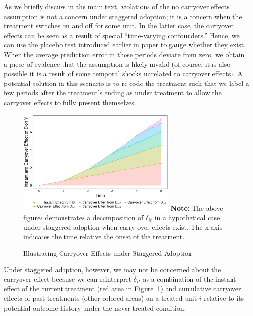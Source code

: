 \documentclass[12pt]{article}
\let\oldcenter\center
\let\oldendcenter\endcenter
\renewenvironment{center}{\setlength\topsep{0pt}\oldcenter}{\oldendcenter}
\begin{document}
As we briefly discuss in the main text, violations of the no carryover effects assumption is not a concern under staggered adoption; it is a concern when the treatment switches on and off for some unit. In the latter case, the carryover effects can be seen as a result of special ``time-varying confounders.'' Hence, we can use the placebo test introduced earlier in paper to gauge whether they exist. When the average prediction error in those periods deviate from zero, we obtain a piece of evidence that the assumption is likely invalid (of course, it is also possible it is a result of some temporal shocks unrelated to carryover effects). A potential solution in this scenario is to re-code the treatment such that we label a few periods after the treatment's ending as under treatment to allow the carryover effects to fully present themselves.
\begin{figure}[!ht]
\caption{Illustrating Carryover Effects under Staggered Adoption}\label{fg:carryover}
\vspace{0.5em}
\centering
\begin{minipage}{1\linewidth}{
\begin{center}
\hspace{1em}\includegraphics[width = 0.7\textwidth]{carryover.pdf}
\end{center}
\footnotesize\textbf{Note:} The above figures demonstrates a decomposition of $\delta_{it}$ in a hypothetical case under staggered adoption when carry over effects exist. The x-axis indicates the time relative the onset of the treatment.}
\end{minipage}\vspace{-0.5em}
\end{figure}

Under staggered adoption, however, we may not be concerned about the carryover effect because we can reinterpret $\delta_{it}$ as a combination of the instant effect of the current treatment (red area in Figure~\ref{fg:carryover}) and cumulative carryover effects of past treatments (other colored areas) on a treated unit $i$ relative to its potential outcome history under the never-treated condition. 
\end{document}
